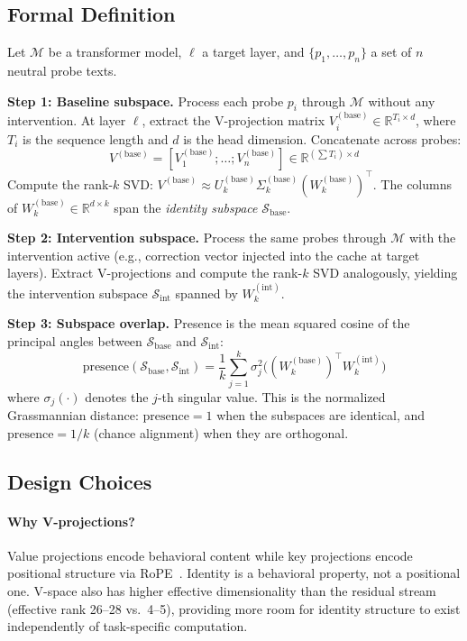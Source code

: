 \documentclass[11pt,a4paper]{article}
\begin{document}
\subsection{Formal Definition}

Let $\mathcal{M}$ be a transformer model, $\ell$ a target layer, and
$\{p_1, \ldots, p_n\}$ a set of $n$ neutral probe texts.

\textbf{Step 1: Baseline subspace.} Process each probe $p_i$ through
$\mathcal{M}$ without any intervention. At layer $\ell$, extract the
V-projection matrix $V_i^{(\text{base})} \in \mathbb{R}^{T_i \times d}$,
where $T_i$ is the sequence length and $d$ is the head dimension. Concatenate
across probes:
\[
V^{(\text{base})} = [V_1^{(\text{base})}; \ldots; V_n^{(\text{base})}]
  \in \mathbb{R}^{(\sum T_i) \times d}
\]
Compute the rank-$k$ SVD: $V^{(\text{base})} \approx U_k^{(\text{base})}
\Sigma_k^{(\text{base})} (W_k^{(\text{base})})^\top$. The columns of
$W_k^{(\text{base})} \in \mathbb{R}^{d \times k}$ span the
\emph{identity subspace} $\mathcal{S}_{\text{base}}$.

\textbf{Step 2: Intervention subspace.} Process the same probes through
$\mathcal{M}$ with the intervention active (e.g., correction vector injected
into the cache at target layers). Extract V-projections and compute the
rank-$k$ SVD analogously, yielding the intervention subspace
$\mathcal{S}_{\text{int}}$ spanned by $W_k^{(\text{int})}$.

\textbf{Step 3: Subspace overlap.} Presence is the mean squared cosine of the
principal angles between $\mathcal{S}_{\text{base}}$ and
$\mathcal{S}_{\text{int}}$:
\begin{equation}
\text{presence}(\mathcal{S}_{\text{base}}, \mathcal{S}_{\text{int}})
  = \frac{1}{k} \sum_{j=1}^{k} \sigma_j^2
    \bigl( (W_k^{(\text{base})})^\top W_k^{(\text{int})} \bigr)
\label{eq:presence}
\end{equation}
where $\sigma_j(\cdot)$ denotes the $j$-th singular value. This is the
normalized Grassmannian distance: $\text{presence} = 1$ when the subspaces
are identical, and $\text{presence} = 1/k$ (chance alignment) when they are
orthogonal.

\subsection{Design Choices}

\paragraph{Why V-projections?}
Value projections encode behavioral content while key projections encode
positional structure via RoPE~\citep{pustovit2026knowledge}. Identity is a
behavioral property, not a positional one. V-space also has higher effective
dimensionality than the residual stream (effective rank 26--28 vs.\ 4--5),
providing more room for identity structure to exist independently of
task-specific computation.
\end{document}
